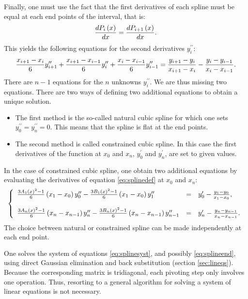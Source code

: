Finally, one must use the fact that the first derivatives of each
spline must be equal at each end points of the interval, that is:
\begin{equation}
 {dP_i\left(x\right)\over dx}={dP_{i+1}\left(x\right)\over dx}.
\end{equation}
This yields the following equations for the second derivatives
$y^{\prime\prime}_i$:
\begin{equation}
\label{eq:splinesyst}
  {x_{i+1}-x_i \over 6}y^{\prime\prime}_{i+1}
  + {x_{i+1}-x_{i-1} \over  6}y^{\prime\prime}_i
  + {x_i-x_{i-1} \over 6}y^{\prime\prime}_{i-1}=
  {y_{i+1}-y_i \over x_{i+1}-x_i} - {y_i-y_{i-1} \over  x_i-x_{i-1}}.
\end{equation}
There are $n-1$ equations for the $n$ unknowns
$y^{\prime\prime}_i$. We are thus missing two equations. There are
two ways of defining two additional equations to obtain a unique
solution.
\begin{itemize}
  \item The first method is the so-called natural cubic spline for which
one sets $y^{\prime\prime}_0=y^{\prime\prime}_n=0$. This means
that the spline is flat at the end points.
  \item The second method is called constrained cubic spline. In this case the
first derivatives of the function at $x_0$ and $x_n$,
$y^{\prime}_0$ and $y^{\prime}_n$, are set to given values.
\end{itemize}

In the case of constrained cubic spline, one obtain two additional
equations by evaluating the derivatives of equation
\ref{eq:splinedef} at $x_0$ and $x_n$:
\begin{equation}
\label{eq:splineend}
 \left\{
  \begin{array}{lcl}
    {3A_1\left(x\right)^2-1\over 6}\left(x_1-x_0\right) y^{\prime\prime}_0 -
    {3B_1\left(x\right)^2-1\over 6}\left(x_1-x_0\right) y^{\prime\prime}_1 & = &
    y^{\prime}_0 - {y_1-y_0 \over x_1-x_0},
    \\*[3 ex]
    {3A_n\left(x\right)^2-1\over 6}\left(x_n-x_{n-1}\right) y^{\prime\prime}_n -
    {3B_n\left(x\right)^2-1\over 6}\left(x_n-x_{n-1}\right) y^{\prime\prime}_{n-1} & = &
    y^{\prime}_n - {y_n-y_{n-1} \over x_n-x_{n-1}}.
  \end{array} \right.
\end{equation}
The choice between natural or constrained spline can be made
independently at each end point.

One solves the system of equations \ref{eq:splinesyst}, and
possibly \ref{eq:splineend}, using direct Gaussian elimination and
back substitution (\cf section \ref{sec:lineqs}). Because the
corresponding matrix is tridiagonal, each pivoting step only
involves one operation. Thus, resorting to a general algorithm for
solving a system of linear equations is not necessary.

